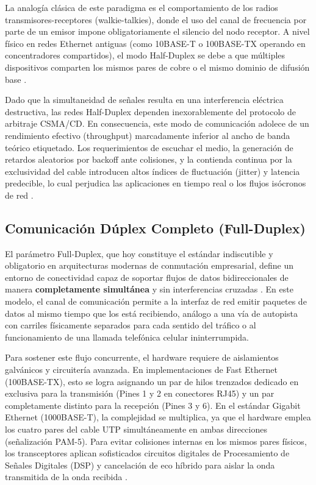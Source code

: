\documentclass[a4paper,12pt]{article}
\begin{document}
La analogía clásica de este paradigma es el comportamiento de los radios transmisores-receptores (walkie-talkies), donde el uso del canal de frecuencia por parte de un emisor impone obligatoriamente el silencio del nodo receptor. A nivel físico en redes Ethernet antiguas (como 10BASE-T o 100BASE-TX operando en concentradores compartidos), el modo Half-Duplex se debe a que múltiples dispositivos comparten los mismos pares de cobre o el mismo dominio de difusión base \cite{tanenbaum2021}. 

Dado que la simultaneidad de señales resulta en una interferencia eléctrica destructiva, las redes Half-Duplex dependen inexorablemente del protocolo de arbitraje CSMA/CD. En consecuencia, este modo de comunicación adolece de un rendimiento efectivo (throughput) marcadamente inferior al ancho de banda teórico etiquetado. Los requerimientos de escuchar el medio, la generación de retardos aleatorios por backoff ante colisiones, y la contienda continua por la exclusividad del cable introducen altos índices de fluctuación (jitter) y latencia predecible, lo cual perjudica las aplicaciones en tiempo real o los flujos isócronos de red \cite{kurose2017}.

\subsection*{Comunicación Dúplex Completo (Full-Duplex)}

El parámetro Full-Duplex, que hoy constituye el estándar indiscutible y obligatorio en arquitecturas modernas de conmutación empresarial, define un entorno de conectividad capaz de soportar flujos de datos bidireccionales de manera \textbf{completamente simultánea} y sin interferencias cruzadas \cite{ieee8023}. En este modelo, el canal de comunicación permite a la interfaz de red emitir paquetes de datos al mismo tiempo que los está recibiendo, análogo a una vía de autopista con carriles físicamente separados para cada sentido del tráfico o al funcionamiento de una llamada telefónica celular ininterrumpida.

Para sostener este flujo concurrente, el hardware requiere de aislamientos galvánicos y circuitería avanzada. En implementaciones de Fast Ethernet (100BASE-TX), esto se logra asignando un par de hilos trenzados dedicado en exclusiva para la transmisión (Pines 1 y 2 en conectores RJ45) y un par completamente distinto para la recepción (Pines 3 y 6). En el estándar Gigabit Ethernet (1000BASE-T), la complejidad se multiplica, ya que el hardware emplea los cuatro pares del cable UTP simultáneamente en ambas direcciones (señalización PAM-5). Para evitar colisiones internas en los mismos pares físicos, los transceptores aplican sofisticados circuitos digitales de Procesamiento de Señales Digitales (DSP) y cancelación de eco híbrido para aislar la onda transmitida de la onda recibida \cite{ieee8023}.
\end{document}

